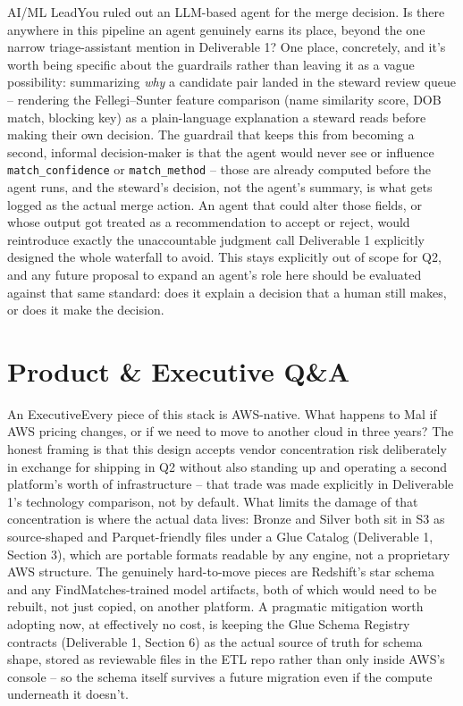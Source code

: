 \documentclass[11pt]{article}
\begin{document}
\begin{stakeholderq}{AI/ML Lead}{You ruled out an LLM-based agent for the merge decision. Is there anywhere in this pipeline an agent genuinely earns its place, beyond the one narrow triage-assistant mention in Deliverable 1?}
One place, concretely, and it's worth being specific about the guardrails rather than leaving it as a vague possibility: summarizing \emph{why} a candidate pair landed in the steward review queue -- rendering the Fellegi--Sunter feature comparison (name similarity score, DOB match, blocking key) as a plain-language explanation a steward reads before making their own decision. The guardrail that keeps this from becoming a second, informal decision-maker is that the agent would never see or influence \texttt{match\_confidence} or \texttt{match\_method} -- those are already computed before the agent runs, and the steward's decision, not the agent's summary, is what gets logged as the actual merge action. An agent that could alter those fields, or whose output got treated as a recommendation to accept or reject, would reintroduce exactly the unaccountable judgment call Deliverable 1 explicitly designed the whole waterfall to avoid. This stays explicitly out of scope for Q2, and any future proposal to expand an agent's role here should be evaluated against that same standard: does it explain a decision that a human still makes, or does it make the decision.
\end{stakeholderq}

\section{Product \& Executive Q\&A}
\label{sec:exec}
\begin{stakeholderq}{An Executive}{Every piece of this stack is AWS-native. What happens to Mal if AWS pricing changes, or if we need to move to another cloud in three years?}
The honest framing is that this design accepts vendor concentration risk deliberately in exchange for shipping in Q2 without also standing up and operating a second platform's worth of infrastructure -- that trade was made explicitly in Deliverable 1's technology comparison, not by default. What limits the damage of that concentration is where the actual data lives: Bronze and Silver both sit in S3 as source-shaped and Parquet-friendly files under a Glue Catalog (Deliverable 1, Section 3), which are portable formats readable by any engine, not a proprietary AWS structure. The genuinely hard-to-move pieces are Redshift's star schema and any FindMatches-trained model artifacts, both of which would need to be rebuilt, not just copied, on another platform. A pragmatic mitigation worth adopting now, at effectively no cost, is keeping the Glue Schema Registry contracts (Deliverable 1, Section 6) as the actual source of truth for schema shape, stored as reviewable files in the ETL repo rather than only inside AWS's console -- so the schema itself survives a future migration even if the compute underneath it doesn't.
\end{stakeholderq}
\end{document}
